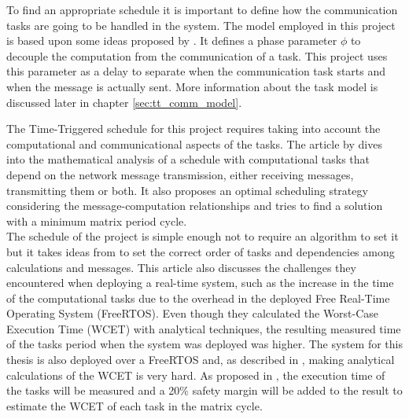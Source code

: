 \documentclass[table,xcdraw]{article}
\begin{document}
To find an appropriate schedule it is important to define how the communication tasks are going to be handled in the system. The model employed in this project is based upon some ideas proposed by \citep{comp_comm_task_model}. It defines a phase parameter $\phi$ to decouple the computation from the communication of a task. This project uses this parameter as a delay to separate when the communication task starts and when the message is actually sent. More information about the task model is discussed later in chapter \ref{sec:tt_comm_model}.\\

\newpage

The Time-Triggered schedule for this project requires taking into account the computational and communicational aspects of the tasks. The article by \citep{optimal_comm_schedule} dives into the mathematical analysis of a schedule with computational tasks that depend on the network message transmission, either receiving messages, transmitting them or both. It also proposes an optimal scheduling strategy considering the message-computation relationships and tries to find a solution with a minimum matrix period cycle.\\

The schedule of the project is simple enough not to require an algorithm to set it but it takes ideas from \citep{optimal_comm_schedule} to set the correct order of tasks and dependencies among calculations and messages. This article also discusses the challenges they encountered when deploying a real-time system, such as the increase in the time of the computational tasks due to the overhead in the deployed Free Real-Time Operating System (FreeRTOS). Even though they calculated the Worst-Case Execution Time (WCET) with analytical techniques, the resulting measured time of the tasks period when the system was deployed was higher. The system for this thesis is also deployed over a FreeRTOS and, as described in \citep{optimal_comm_schedule}, making analytical calculations of the WCET is very hard. As proposed in \citep{wcet}, the execution time of the tasks will be measured and a 20$\%$ safety margin will be added to the result to estimate the WCET of each task in the matrix cycle.\\
\end{document}
